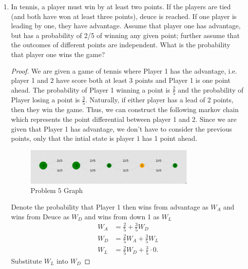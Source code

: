 \documentclass[a4paper]{article}
\begin{document}
\begin{enumerate}
\begin{proof}
\[\begin{pmatrix}
0.00 & 1.3333 & 0.4975 & 0.9950 \\
0.00 & 0.00 & 1.4925 & 0.9851 \\
0.00 & 0.00 & 0.00 & 2.00 \\
\end{pmatrix}
.\] 
We know that 
\[
  E[T \mid X_0 = 1] = \sum_{j=1}^{n} (N)_{1,j} = (N \cdot \vec{1})_{1} = 3.076
.\] 
\end{proof}
  \item In tennis, a player must win by at least two points. If the players are tied (and both have won at
least three points), deuce is reached. If one player is leading by one, they have advantage. Assume
that player one has advantage, but has a probability of 2/5 of winning any given point; further
assume that the outcomes of different points are independent. What is the probability that player
one wins the game?
\begin{proof}
We are given a game of tennis where Player 1 has the advantage, i.e. player 1 and 2 have score both at least  $3$ points and Player 1 is one point ahead. The probability of Player 1 winning a point is $\frac{2}{5}$ and the probability of Player  losing a point is $\frac{3}{5}$. Naturally, if either player has a lead of 2 points, then they win the game. Thus, we can construct the following markov chain which represents the point differential between player 1 and 2. Since we are given that Player 1 has advantage, we don't have to consider the previous points, only that the intial state is player  $1$ has 1 point ahead.
\begin{figure}[h]
  \centering
  \includegraphics[width=0.8\textwidth]{assets/markov_chain_tennis_problem.png}
  \caption{Problem 5 Graph}
  \label{fig:markov_chain_tennis_problem}
\end{figure}
Denote the probability that Player 1 then wins from advantage as $W_A$ and wins from Deuce as  $W_D$ and wins from down 1 as $W_L$
\begin{align}
  W_A &= \frac{2}{5} + \frac{3}{5} W_D \\
  W_D &= \frac{2}{5} W_A + \frac{3}{5}W_L \\
  W_L &= \frac{2}{5} W_D + \frac{3}{5} \cdot 0 
.\end{align}
Substitute $W_L$ into  $W_D$

\end{proof}
\end{enumerate}
\end{document}
